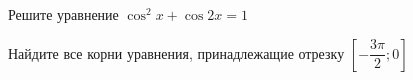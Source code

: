 \begin{ex}
	\begin{condition}
		\begin{enumcols}[label=\asbuk*)]
			\item Решите уравнение \( \cos^2 x + \cos 2x = 1 \)
			\item Найдите все корни уравнения, принадлежащие отрезку \( \left[-\dfrac{3\pi}{2};0\right] \)
		\end{enumcols}
	\end{condition}
\end{ex}